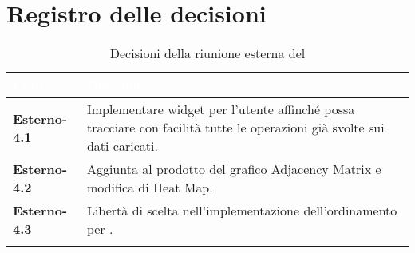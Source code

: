 \section{Registro delle decisioni}
{
\renewcommand{\arraystretch}{1.5}
\centering
\begin{longtable}{C{3cm} C{9cm}}
\textcolor{white}{\textbf{Codice}}&
\textcolor{white}{\textbf{Decisione}}\\	
\endhead
		
\textbf{Esterno-4.1} & Implementare widget per l'utente affinché possa tracciare con facilità tutte le operazioni già svolte sui dati caricati. \\

\textbf{Esterno-4.2} & Aggiunta al prodotto del grafico Adjacency Matrix e modifica di Heat Map.\\

\textbf{Esterno-4.3} & Libertà di scelta nell'implementazione dell'ordinamento per .\\

\caption{Decisioni della riunione esterna del \Data{}}
		
\end{longtable}
}
